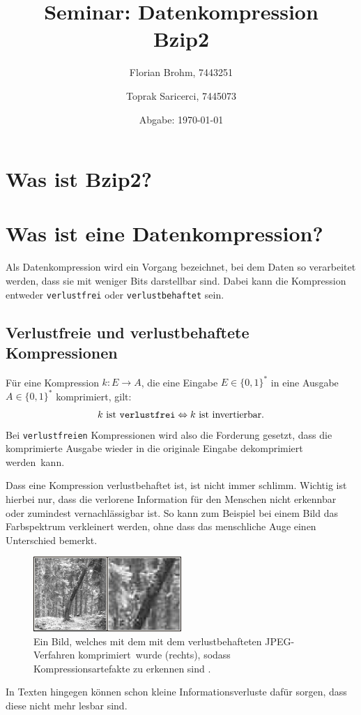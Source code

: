 \documentclass{article}
\date{Abgabe: \today}
\author{Florian Brohm, 7443251 \and Toprak Saricerci, 7445073}
\title{Seminar: Datenkompression\\Bzip2}
\newcommand{\Llr}{\Leftrightarrow}
\newcommand{\para}{\par\null\par}
\begin{document}
\maketitle
\newpage

{
    \hypersetup{linkcolor=blue}
    \tableofcontents
}
\listoffigures
\newpage
\section{Was ist Bzip2?}
\vspace*{3cm}
\section{Was ist eine Datenkompression?}
Als Datenkompression wird ein Vorgang bezeichnet, bei dem Daten so verarbeitet werden, 
dass sie mit weniger Bits darstellbar sind. Dabei kann die Kompression entweder 
\texttt{verlustfrei} oder \texttt{verlustbehaftet} sein.
\subsection{Verlustfreie und verlustbehaftete Kompressionen}
Für eine Kompression $k: E \to A$, die eine Eingabe $E \in \{0,1\}^*$ in eine Ausgabe $A \in \{0,1\}^*$
komprimiert, gilt:
\[k \text{ ist \texttt{verlustfrei}} \Llr k \text{ ist invertierbar}.\]
Bei \texttt{verlustfreien} Kompressionen wird also die Forderung gesetzt, dass die 
komprimierte Ausgabe wieder in die originale Eingabe dekomprimiert werden~kann.
\para
Dass eine Kompression verlustbehaftet ist, ist nicht immer schlimm. Wichtig ist hierbei nur, 
dass die verlorene Information für den Menschen nicht erkennbar oder zumindest 
vernachlässigbar ist. So kann zum Beispiel bei einem Bild das Farbspektrum 
verkleinert werden, ohne dass das menschliche Auge einen Unterschied bemerkt.
\begin{figure}[H]
    \centering
    \includegraphics*[width=0.5\textwidth]{images/jpeg.jpg}
    \caption[Verlustbehaftete Kompression eines Bildes]{
        Ein Bild, welches mit dem mit dem verlustbehafteten JPEG-Verfahren komprimiert~wurde (rechts), 
        sodass Kompressionsartefakte zu erkennen sind \cite*{jpeg}.
    }
\end{figure}
In Texten hingegen können schon kleine Informationsverluste dafür sorgen, 
dass diese nicht mehr lesbar sind.
\end{document}
